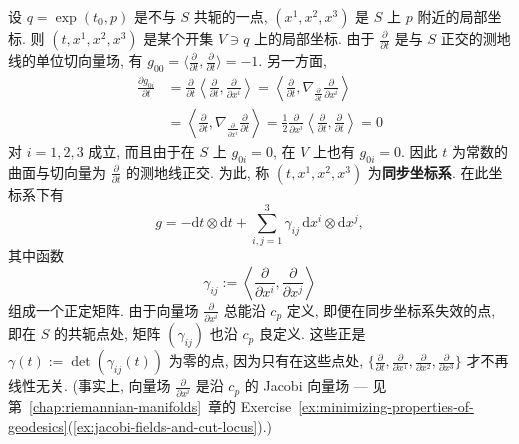 设 $q=\exp(t_0,p)$ 是不与 $S$ 共轭的一点, $(x^1,x^2,x^3)$ 是 $S$ 上 $p$ 附近的局部坐标. 则 $(t,x^1,x^2,x^3)$ 是某个开集 $V\ni q$ 上的局部坐标. 由于 $\frac{\partial}{\partial t}$ 是与 $S$ 正交的测地线的单位切向量场, 有 $g_{00}=\langle\frac{\partial}{\partial t},\frac{\partial}{\partial t}\rangle=-1$. 另一方面,
\begin{align*}
  \frac{\partial g_{0i}}{\partial t}
   &=\frac{\partial}{\partial t}\left\langle\frac{\partial}{\partial t},
              \frac{\partial}{\partial x^i}\right\rangle
    =\left\langle\frac{\partial}{\partial t},
              \nabla_{\frac{\partial}{\partial t}}\frac{\partial}{\partial x^i}\right\rangle\\
   &=\left\langle\frac{\partial}{\partial t},
              \nabla_{\frac{\partial}{\partial x^i}}\frac{\partial}{\partial t}\right\rangle
    =\frac{1}{2}\frac{\partial}{\partial x^i}
              \left\langle\frac{\partial}{\partial t},\frac{\partial}{\partial t}\right\rangle=0
\end{align*}
对 $i=1,2,3$ 成立, 而且由于在 $S$ 上 $g_{0i}=0$, 在 $V$ 上也有 $g_{0i}=0$. 因此 $t$ 为常数的曲面与切向量为 $\frac{\partial}{\partial t}$ 的测地线正交. 为此, 称 $(t,x^1,x^2,x^3)$ 为\textbf{同步坐标系}. 在此坐标系下有
\[
  g=-\mathrm{d}t\otimes\mathrm{d}t
      +\sum_{i,j=1}^3\gamma_{ij}\,\mathrm{d}x^i\otimes\mathrm{d}x^j,
\]
其中函数
\[
  \gamma_{ij}:=\left\langle\frac{\partial}{\partial x^i},
                                  \frac{\partial}{\partial x^j}\right\rangle
\]
组成一个正定矩阵. 由于向量场 $\frac{\partial}{\partial x^i}$ 总能沿 $c_p$ 定义, 即便在同步坐标系失效的点, 即在 $S$ 的共轭点处, 矩阵 $(\gamma_{ij})$ 也沿 $c_p$ 良定义. 这些正是 $\gamma(t):=\det(\gamma_{ij}(t))$ 为零的点, 因为只有在这些点处, $\{\frac{\partial}{\partial t},\frac{\partial}{\partial x^1},\frac{\partial}{\partial x^2},\frac{\partial}{\partial x^3}\}$ 才不再线性无关. (事实上, 向量场 $\frac{\partial}{\partial x^i}$ 是沿 $c_p$ 的 Jacobi 向量场 --- 见第~\ref{chap:riemannian-manifolds}~章的 Exercise~\ref{ex:minimizing-properties-of-geodesics}(\ref{ex:jacobi-fields-and-cut-locus}).)

